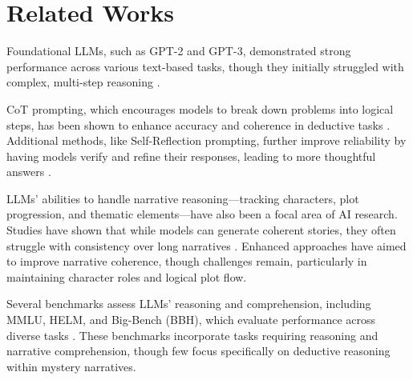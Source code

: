 \section{Related Works}
Foundational LLMs, such as GPT-2 and GPT-3, demonstrated strong performance across various text-based tasks, though they initially struggled with complex, multi-step reasoning \citep{radford2019language, brown2020language}. 



CoT prompting, which encourages models to break down problems into logical steps, has been shown to enhance accuracy and coherence in deductive tasks \citep{wei2022chain}. 
Additional methods, like Self-Reflection prompting, further improve reliability by having models verify and refine their responses, leading to more thoughtful answers \citep{shinn2024reflexion, madaan2024self}.


LLMs' abilities to handle narrative reasoning—tracking characters, plot progression, and thematic elements—have also been a focal area of AI research. 
Studies have shown that while models can generate coherent stories, they often struggle with consistency over long narratives \citep{ammanabrolu2021automated, rashkin2020plotmachines}. 
Enhanced approaches have aimed to improve narrative coherence, though challenges remain, particularly in maintaining character roles and logical plot flow.


Several benchmarks assess LLMs’ reasoning and comprehension, including MMLU, HELM, and Big-Bench (BBH), which evaluate performance across diverse tasks \citep{hendrycks2020measuring, liang2022holistic, srivastava2022beyond}. 
These benchmarks incorporate tasks requiring reasoning and narrative comprehension, though few focus specifically on deductive reasoning within mystery narratives.



%